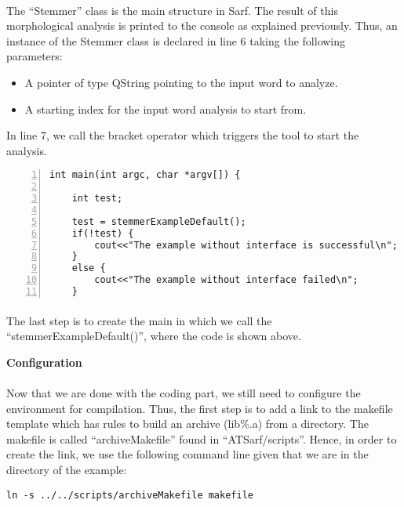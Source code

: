 \documentclass{article}
\begin{document}
\paragraph{}
The ``Stemmer'' class is the main structure in Sarf. The result of this morphological analysis is printed to the console as explained previously. Thus, an instance of the Stemmer class is declared in line 6 taking the following parameters:
\begin{itemize}
\item A pointer of type QString pointing to the input word to analyze.
\item A starting index for the input word analysis to start from.
\end{itemize}
In line 7, we call the bracket operator which triggers the tool to start the analysis.

\begin{Verbatim}[numbers=left]
int main(int argc, char *argv[]) {

    int test;
    
    test = stemmerExampleDefault();
    if(!test) {
        cout<<"The example without interface is successful\n";
    }
    else {
        cout<<"The example without interface failed\n";
    }
\end{Verbatim}

\paragraph{}
The last step is to create the main in which we call the ``stemmerExampleDefault()'', where the code is shown above.

\begin{center}
\textbf{Configuration}
\end{center}

\paragraph{}
Now that we are done with the coding part, we still need to configure the environment for compilation. Thus, the first step is to add a link to the makefile template which has rules to build an archive (lib\%.a) from a directory. The makefile is called ``archiveMakefile'' found  in ``ATSarf/scripts''. Hence, in order to create the link, we use the following command line given that we are in the directory of the example:

\begin{Verbatim}
ln -s ../../scripts/archiveMakefile makefile
\end{Verbatim}
\end{document}
